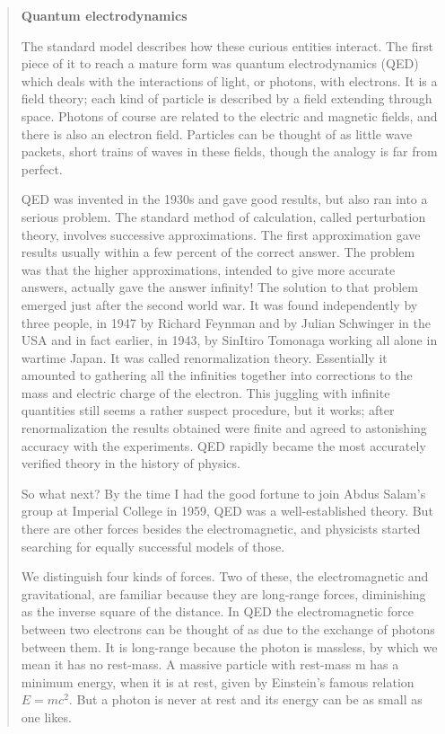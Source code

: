 \begin{quote}
\textbf{Quantum electrodynamics}

The standard model describes how these curious entities interact. The first piece of it to reach a mature form was quantum electrodynamics (QED) which deals with the interactions of light, or photons, with electrons. It is a field theory; each kind of particle is described by a field extending through space. Photons of course are related to the electric and magnetic fields, and there is also an electron field. Particles can be thought of as little wave packets, short trains of waves in these fields, though the analogy is far from perfect.

QED was invented in the 1930s and gave good results, but also ran into a serious problem. The standard method of calculation, called perturbation theory, involves successive approximations. The first approximation gave results usually within a few percent of the correct answer. The problem was that the higher approximations, intended to give more accurate answers, actually gave the answer infinity! The solution to that problem emerged just after the second world war. It was found independently by three people, in 1947 by Richard Feynman and by Julian Schwinger in the USA and in fact earlier, in 1943, by SinItiro Tomonaga working all alone in wartime Japan. It was called renormalization theory. Essentially it amounted to gathering all the infinities together into corrections to the mass and electric charge of the electron. This juggling with infinite quantities still seems a rather suspect procedure, but it works; after renormalization the results obtained were finite and agreed to astonishing accuracy with the experiments. QED rapidly became the most accurately verified theory in the history of physics.

So what next? By the time I had the good fortune to join Abdus Salam’s group at Imperial College in 1959, QED was a well-established theory. But there are other forces besides the electromagnetic, and physicists started searching for equally successful models of those.

We distinguish four kinds of forces. Two of these, the electromagnetic and gravitational, are familiar because they are long-range forces, diminishing as the inverse square of the distance. In QED the electromagnetic force between two electrons can be thought of as due to the exchange of photons between them. It is long-range because the photon is massless, by which we mean it has no rest-mass. A massive particle with rest-mass m has a minimum energy, when it is at rest, given by Einstein’s famous relation $E = mc^2$. But a photon is never at rest and its energy can be as small as one likes.


\end{quote}
